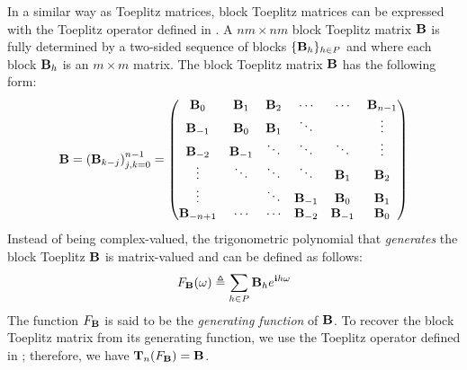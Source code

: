 In a similar way as Toeplitz matrices, block Toeplitz matrices can be expressed with the Toeplitz operator defined in .
A $nm\times nm$ block Toeplitz matrix $\mathbf{B}$ is fully determined by a two-sided sequence of blocks $\{\mathbf{B}_h\}_{h \in P}$ and where each block $\mathbf{B}_h$ is an $m \times m$ matrix.  
The block Toeplitz matrix $\mathbf{B}$ has the following form:
\begin{equation}
  \Bmat = \leftmat \Bmat_{k-j} \rightmat_{j,k = 0}^{n-1} = 
  \leftmatrix
    \Bmat_{0}    & \Bmat_{1}  & \Bmat_{2} & \cdots     & \cdots     & \Bmat_{n-1} \\
    \Bmat_{-1}   & \Bmat_{0}  & \Bmat_{1} & \ddots     &            & \vdots      \\
    \Bmat_{-2}   & \Bmat_{-1} & \ddots    & \ddots     & \ddots     & \vdots      \\ 
    \vdots       & \ddots     & \ddots    & \ddots     & \Bmat_{1}  & \Bmat_{2}   \\
    \vdots       &            & \ddots    & \Bmat_{-1} & \Bmat_{0}  & \Bmat_{1}   \\
    \Bmat_{-n+1} & \cdots     & \cdots    & \Bmat_{-2} & \Bmat_{-1} & \Bmat_0
  \rightmatrix
\end{equation}
\noindent
Instead of being complex-valued, the trigonometric polynomial that \emph{generates} the block Toeplitz $\mathbf{B}$ is matrix-valued and can be defined as follows:
\begin{equation}
  F_{\mathbf{B}}(\omega) \triangleq \sum_{h \in P} \mathbf{B}_h e^{\mathbf{i} h \omega}
\end{equation}
The function $F_{\mathbf{B}}$ is said to be the \emph{generating function} of $\mathbf{B}$.
To recover the block Toeplitz matrix from its generating function, we use the Toeplitz operator defined in ; therefore, we have $\mathbf{T}_n(F_\mathbf{B}) = \mathbf{B}$.


